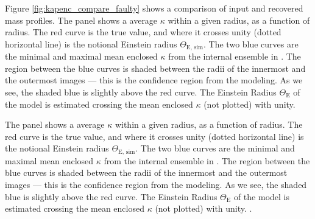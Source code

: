 Figure \ref{fig:kapenc_compare_faulty} shows a comparison of input and
recovered mass profiles.  The panel shows a average $\kappa$ within a
given radius, as a function of radius.  The red curve is the true
value, and where it crosses unity (dotted horizontal line) is the
notional Einstein radius $\Theta_{\text{E, sim}}$.  The two blue
curves are the minimal and maximal mean enclosed $\kappa$ from the
internal ensemble in \spl.  The region between the blue curves is
shaded between the radii of the innermost and the outermost images ---
this is the confidence region from the modeling.  As we see, the
shaded blue is slightly above the red curve.  The Einstein Radius
$\Theta_\text{E}$ of the model is estimated crossing the mean enclosed
$\kappa$ (not plotted) with unity.

The panel shows a average $\kappa$ within a given radius, as a
function of radius.  The red curve is the true value, and where it
crosses unity (dotted horizontal line) is the notional Einstein radius
$\Theta_{\text{E, sim}}$.  The two blue curves are the minimal and
maximal mean enclosed $\kappa$ from the internal ensemble in \spl.
The region between the blue curves is shaded between the radii of the
innermost and the outermost images --- this is the confidence region
from the modeling.  As we see, the shaded blue is slightly above the
red curve.  The Einstein Radius $\Theta_\text{E}$ of the model is
estimated crossing the mean enclosed $\kappa$ (not plotted) with
unity. \citep[see, e.g.,][]{2002LNP...608....1C}.

